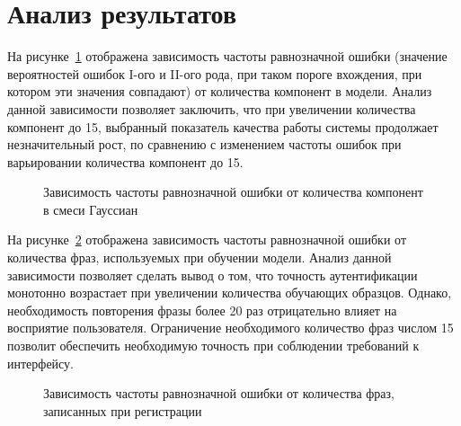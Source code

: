 \section{Анализ результатов}

На рисунке~\ref{fig:eer_from_k} отображена зависимость частоты равнозначной ошибки (значение вероятностей ошибок I-ого и II-ого рода, при таком пороге вхождения, при котором эти значения совпадают) от количества компонент в модели. Анализ данной зависимости позволяет заключить, что при увеличении количества компонент до 15, выбранный показатель качества работы системы продолжает незначительный рост, по сравнению с изменением частоты ошибок при варьировании количества компонент до 15. 

\begin{figure}[ht!]
\caption{Зависимость частоты равнозначной ошибки от количества компонент в смеси Гауссиан}
\label{fig:eer_from_k}
\end{figure}

На рисунке~\ref{fig:eer_from_n} отображена зависимость частоты равнозначной ошибки от количества фраз, используемых при обучении модели. Анализ данной зависимости позволяет сделать вывод о том, что точность аутентификации монотонно возрастает при увеличении количества обучающих образцов. Однако, необходимость повторения фразы более 20 раз отрицательно влияет на восприятие пользователя. Ограничение необходимого количество фраз числом 15 позволит обеспечить необходимую точность при соблюдении требований к интерфейсу.

\begin{figure}[ht!]
\caption{Зависимость частоты равнозначной ошибки от количества фраз, записанных при регистрации}
\label{fig:eer_from_n}
\end{figure}

